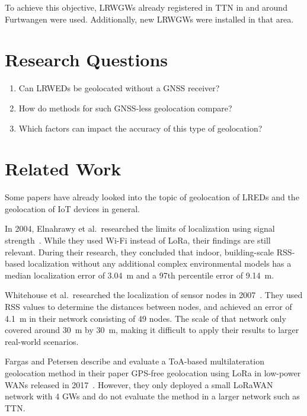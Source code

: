 To achieve this objective, \aclp{LRWGW} already registered in \acf{TTN} in and around Furtwangen were used.
Additionally, new \aclp{LRWGW} were installed in that area.

\section{Research Questions}\label{sec:introduction-research-questions}

\begin{enumerate}
      \item Can \aclp{LRWED} be geolocated without a \ac{GNSS} receiver?
      \item How do methods for such \ac{GNSS}-less geolocation compare?
      \item Which factors can impact the accuracy of this type of geolocation?
\end{enumerate}

\section{Related Work}\label{sec:related-work}

Some papers have already looked into the topic of geolocation of \aclp{LRED} and the geolocation of \ac{IoT} devices in general.

In 2004, Elnahrawy et al.\ researched the limits of localization using signal strength~\cite{elnahrawy_limits_2004}.
While they used Wi-Fi instead of \ac{LoRa}, their findings are still relevant.
During their research, they concluded that indoor, building-scale \ac{RSS}-based localization without any additional complex environmental models has a median localization error of \SI{3.04}{\meter} and a 97th percentile error of \SI{9.14}{\meter}.

Whitehouse et al.\ researched the localization of sensor nodes in 2007~\cite{whitehouse_practical_2007}.
They used \ac{RSS} values to determine the distances between nodes, and achieved an error of \SI{4.1}{\meter} in their network consisting of 49 nodes.
The scale of that network only covered around \SI{30}{\meter} by \SI{30}{\meter}, making it difficult to apply their results to larger real-world scenarios.

Fargas and Petersen describe and evaluate a \ac{ToA}-based multilateration geolocation method in their paper \acs{GPS}-free geolocation using \acs{LoRa} in low-power \acsp{WAN} released in 2017~\cite{fargas_gps-free_2017}.
However, they only deployed a small \ac{LoRaWAN} network with 4 \aclp{GW} and do not evaluate the method in a larger network such as \ac{TTN}.

